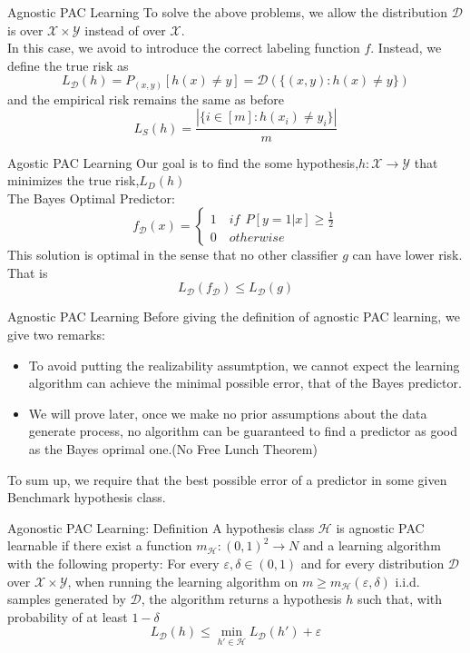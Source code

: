 \documentclass{beamer}
\begin{document}
\begin{frame}{Agnostic PAC Learning}
	To solve the above problems, we allow the distribution $\mathcal{D}$ is over $\mathcal{X} \times \mathcal{Y} $ instead of over $\mathcal{X}$. \\
	In this case, we avoid to introduce the correct labeling function $f$. Instead, we define the true risk as 
	\[L_{\mathcal{D}}(h) = P_{(x,y)} [h(x) \neq  y] = \mathcal{D} (\{(x,y):h(x) \neq y\})\]
	and the empirical risk remains the same as before
\[L_S(h) = \frac{|\{i \in [m]:h(x_i) \neq y_i\}|}{m}\]
\end{frame}
\begin{frame}{Agostic PAC Learning}
	Our goal is to find the some hypothesis,$h: \mathcal{X} \rightarrow \mathcal{Y}$ that minimizes the true risk,$L_D(h)$ \\
	The Bayes Optimal Predictor:
	\[f_{\mathcal{D}} (x) = \begin{cases}
			1 \quad if \ \ P[y=1|x] \geq \frac{1}{2} \\
			0 \quad otherwise
		\end{cases}
		\]
	This solution is optimal in the sense that no other classifier $g$ can have lower risk. That is 
	\[L_{\mathcal{D}} (f_{\mathcal{D}}) \leq L_{\mathcal{D}} (g)\]
\end{frame}
\begin{frame}{Agnostic PAC Learning}
	Before giving the definition of agnostic PAC learning, we give two remarks:
	\begin{itemize}
		\item To avoid putting the realizability assumtption, we cannot expect the learning algorithm can achieve the minimal possible error, that of the Bayes predictor.
		\item We will prove later, once we make no prior assumptions about the data generate process, no algorithm can be guaranteed to find a predictor as good as the Bayes oprimal one.(No Free Lunch Theorem)
	\end{itemize}
	To sum up, we require that the best possible error of a predictor in some given Benchmark hypothesis class.
\end{frame}
\begin{frame}{Agonostic PAC Learning: Definition}
	A hypothesis class $\mathcal{H}$ is agnostic PAC learnable if there exist a function $m_{\mathcal{H}}:(0,1)^2 \rightarrow N$ and a learning algorithm with the following property: For every $\varepsilon, \delta \in (0,1)$ and for every distribution $\mathcal{D}$ over $\mathcal{X} \times \mathcal{Y}$, when running the learning algorithm on $m \geq m_{\mathcal{H}}(\varepsilon,\delta)$ i.i.d. samples generated by $\mathcal{D}$, the algorithm returns a hypothesis $h$ such that, with probability of at least $1-\delta$
	\[L_{\mathcal{D}}(h) \leq \min_{h' \in \mathcal{H}} L_{\mathcal{D}}(h') + \varepsilon\]
\end{frame}
\end{document}
